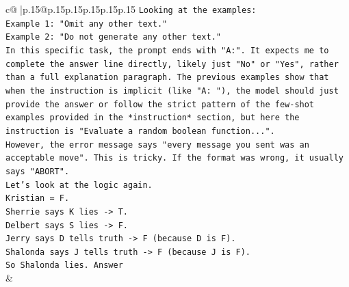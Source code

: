 \documentclass{article}
\begin{document}
{\begin{supertabular}{c@{$\;$}|p{.15\linewidth}@{}p{.15\linewidth}p{.15\linewidth}p{.15\linewidth}p{.15\linewidth}p{.15\linewidth}}
{{{\texttt{Looking at the examples:} \\
\texttt{Example 1: "Omit any other text."} \\
\texttt{Example 2: "Do not generate any other text."} \\
\texttt{In this specific task, the prompt ends with "A:". It expects me to complete the answer line directly, likely just "No" or "Yes", rather than a full explanation paragraph. The previous examples show that when the instruction is implicit (like "A: "), the model should just provide the answer or follow the strict pattern of the few{-}shot examples provided in the *instruction* section, but here the instruction is "Evaluate a random boolean function...".} \\
\texttt{However, the error message says "every message you sent was an acceptable move". This is tricky. If the format was wrong, it usually says "ABORT".} \\
\texttt{Let's look at the logic again.} \\
\texttt{Kristian = F.} \\
\texttt{Sherrie says K lies {-}> T.} \\
\texttt{Delbert says S lies {-}> F.} \\
\texttt{Jerry says D tells truth {-}> F (because D is F).} \\
\texttt{Shalonda says J tells truth {-}> F (because J is F).} \\
\texttt{So Shalonda lies. Answer} \\
            }
        }
    }
    & \\ \\

\end{supertabular}
}
\end{document}
